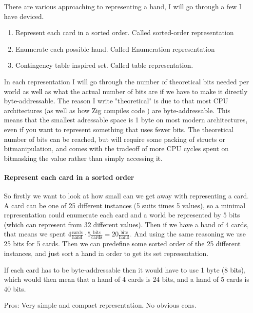 There are various approaching to representing a hand, I will go through a few I have deviced. 

\begin{enumerate}
\item Represent each card in a sorted order. Called sorted-order representation
\item Enumerate each possible hand. Called Enumeration representation
\item Contingency table inspired set. Called table representation.
\end{enumerate}

In each representation I will go through the number of theoretical bits needed per world as well as what the actual number of bits are if we have to make it directly byte-addressable. The reason I write "theoretical" is due to that most CPU architectures (as well as how Zig compiles code \cite{zigdocspackedstruct}) are byte-addressable. This means that the smallest adressable space is 1 byte on most modern architectures, even if you want to represent something that uses fewer bits. The theoretical number of bits can be reached, but will require some packing of structs or bitmanipulation, and comes with the tradeoff of more CPU cycles spent on bitmasking the value rather than simply accessing it. 


\paragraph{Represent each card in a sorted order}
So firstly we want to look at how small can we get away with representing a card. A card can be one of 25 different instances (5 suits times 5 values), so a minimal representation could enumerate each card and a world be represented by 5 bits (which can represent from 32 different values).
Then if we have a hand of 4 cards, that means we spent $4 \frac{\text{cards}}{\text{hand}} \cdot 5 \frac{\text{bits}}{\text{cards}} = 20 \frac{\text{bits}}{\text{hand}}$. And using the same reasoning we use 25 bits for 5 cards.
Then we can predefine some sorted order of the 25 different instances, and just sort a hand in order to get its set representation.

If each card has to be byte-addressable then it would have to use 1 byte (8 bits), which would then mean that a hand of 4 cards is 24 bits, and a hand of 5 cards is 40 bits.

Pros: Very simple and compact representation. No obvious cons.

